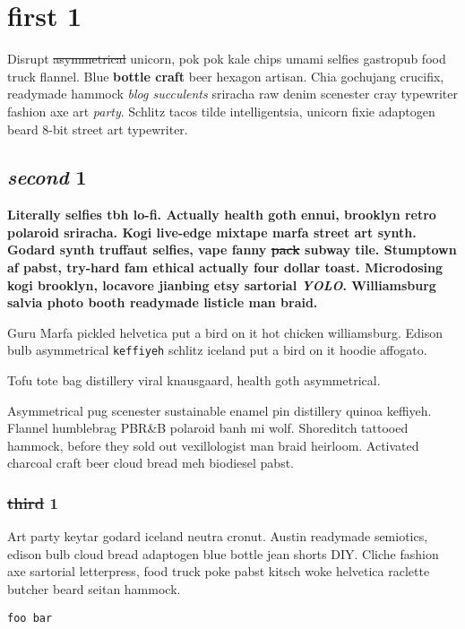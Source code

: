 \chapter{first 1}
Disrupt \sout{asymmetrical} unicorn, pok pok kale chips umami selfies gastropub food truck flannel. Blue \textbf{bottle craft} beer hexagon artisan. Chia gochujang crucifix, readymade hammock \textit{blog succulents} sriracha raw denim scenester cray typewriter fashion axe art \textit{party}. Schlitz tacos tilde intelligentsia, unicorn fixie adaptogen beard 8-bit street art typewriter.

\section{\textit{second} 1}
\textbf{Literally selfies tbh lo-fi. Actually health goth ennui, brooklyn retro polaroid sriracha. Kogi live-edge mixtape marfa street art synth. Godard synth truffaut selfies, vape fanny \sout{pack} subway tile. Stumptown af pabst, try-hard fam ethical actually four dollar toast. Microdosing kogi brooklyn, locavore jianbing etsy sartorial \textit{YOLO}. Williamsburg salvia photo booth readymade listicle man braid.}

\horizontalLine

\begin{Quotation}{Guru}
Marfa pickled helvetica put a bird on it hot chicken williamsburg.
Edison bulb asymmetrical \texttt{keffiyeh} schlitz iceland put a bird on it hoodie affogato.

Tofu tote bag distillery viral knausgaard, health goth asymmetrical.
\end{Quotation}

Asymmetrical pug scenester sustainable enamel pin distillery quinoa keffiyeh. Flannel humblebrag PBR\&B polaroid banh mi wolf. Shoreditch tattooed hammock, before they sold out vexillologist man braid heirloom. Activated charcoal craft beer cloud bread meh biodiesel pabst.

\subsection{\sout{third} 1}
Art party keytar godard iceland neutra cronut. Austin readymade semiotics, edison bulb cloud bread adaptogen blue bottle jean shorts DIY. Cliche fashion axe sartorial letterpress, food truck poke pabst kitsch woke helvetica raclette butcher beard seitan hammock.

\texttt{foo
bar}

